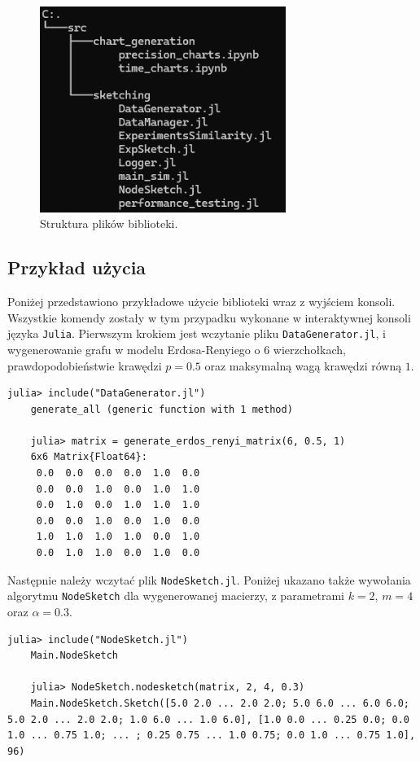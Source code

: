 \newpage

\begin{figure}[!ht]
    \includegraphics[width=8cm]{img/folder_structure.png}
    \centering
    \caption[Struktura plików]{Struktura plików biblioteki.}
    \label{fig:folder_structure}
\end{figure}

\subsection*{Przykład użycia}

Poniżej przedstawiono przykładowe użycie biblioteki wraz z wyjściem konsoli. Wszystkie komendy zostały w tym przypadku wykonane w interaktywnej konsoli języka \texttt{Julia}. Pierwszym krokiem jest wczytanie pliku \texttt{DataGenerator.jl}, i wygenerowanie grafu w modelu Erdosa-Renyiego o $6$ wierzchołkach, prawdopodobieństwie krawędzi $p = 0.5$ oraz maksymalną wagą krawędzi równą $1$.

\begin{lstlisting}[basicstyle=\footnotesize]
    julia> include("DataGenerator.jl")
    generate_all (generic function with 1 method)
    
    julia> matrix = generate_erdos_renyi_matrix(6, 0.5, 1)
    6x6 Matrix{Float64}:
     0.0  0.0  0.0  0.0  1.0  0.0
     0.0  0.0  1.0  0.0  1.0  1.0
     0.0  1.0  0.0  1.0  1.0  1.0
     0.0  0.0  1.0  0.0  1.0  0.0
     1.0  1.0  1.0  1.0  0.0  1.0
     0.0  1.0  1.0  0.0  1.0  0.0
\end{lstlisting}

Następnie należy wczytać plik \texttt{NodeSketch.jl}. Poniżej ukazano także wywołania algorytmu \texttt{NodeSketch} dla wygenerowanej macierzy, z parametrami $k = 2$, $m = 4$ oraz $\alpha = 0.3$.

\begin{lstlisting}[basicstyle=\footnotesize]
    julia> include("NodeSketch.jl")
    Main.NodeSketch
    
    julia> NodeSketch.nodesketch(matrix, 2, 4, 0.3)
    Main.NodeSketch.Sketch([5.0 2.0 ... 2.0 2.0; 5.0 6.0 ... 6.0 6.0; 5.0 2.0 ... 2.0 2.0; 1.0 6.0 ... 1.0 6.0], [1.0 0.0 ... 0.25 0.0; 0.0 1.0 ... 0.75 1.0; ... ; 0.25 0.75 ... 1.0 0.75; 0.0 1.0 ... 0.75 1.0], 96)
\end{lstlisting}

